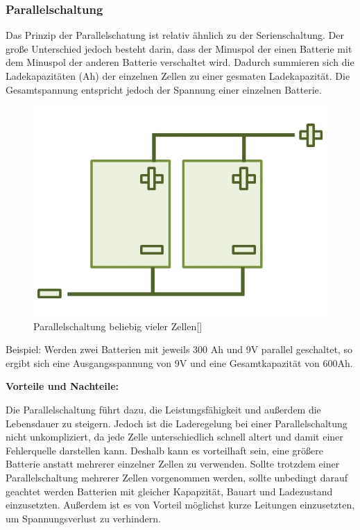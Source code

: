 \subsubsection{Parallelschaltung}
Das Prinzip der Parallelschatung ist relativ ähnlich zu der Serienschaltung. Der große Unterschied jedoch besteht darin, dass der Minuspol der einen Batterie mit dem Minuspol der anderen Batterie verschaltet wird. Dadurch summieren sich die Ladekapazitäten (Ah) der einzelnen Zellen zu einer gesmaten Ladekapazität. Die Gesamtspannung entspricht jedoch der Spannung einer einzelnen Batterie. 

\begin{figure}[H]
	\begin{center}
		\includegraphics[scale=1.0]{figures/Akku/ParallelschaltungzweierBatterien.org.jpg}
		\caption{Parallelschaltung beliebig vieler Zellen[\cite{ParallelschaltungZellen}]}
		\label{fig: Parallelschaltung beliebig vieler Zellen}
	\end{center}
\end{figure}

Beispiel: Werden zwei Batterien mit jeweils 300 Ah und 9V parallel geschaltet, so ergibt sich eine Ausgangsspannung von 9V und eine Gesamtkapazität von 600Ah. \medskip

\textbf{Vorteile und Nachteile:}

Die Parallelschaltung führt dazu, die Leistungsfähigkeit und außerdem die Lebensdauer zu steigern. Jedoch ist die Laderegelung bei einer Parallelschaltung nicht unkompliziert, da jede Zelle unterschiedlich schnell altert und damit einer Fehlerquelle darstellen kann. Deshalb kann es vorteilhaft sein, eine größere Batterie anstatt mehrerer einzelner Zellen zu verwenden. Sollte trotzdem einer Parallelschaltung mehrerer Zellen vorgenommen werden, sollte unbedingt darauf geachtet werden Batterien mit gleicher  Kapapzität, Bauart und Ladezustand einzusetzten. Außerdem ist es von Vorteil möglichst kurze Leitungen einzusetzten, um Spannungsverlust zu verhindern.
\newpage

